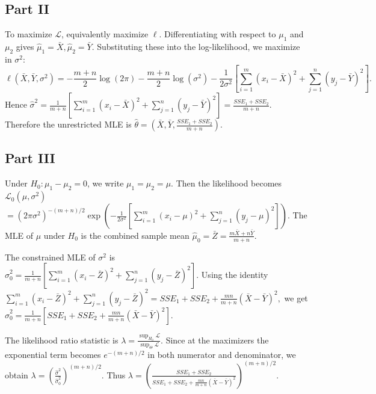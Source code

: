 \documentclass[letterpaper]{article}
\begin{document}
		\clearpage
		
		\subsection{Part II}
		
		To maximize $\mathcal L$, equivalently maximize $\ell$. Differentiating with respect to $\mu_1$ and $\mu_2$ gives
		$
		\hat\mu_1=\bar X,  \hat\mu_2=\bar Y.
		$ Substituting these into the log-likelihood, we maximize in $\sigma^2$:
		$$
		\ell(\bar X,\bar Y,\sigma^2)
		=
		-\frac{m+n}{2}\log(2\pi)
		-\frac{m+n}{2}\log(\sigma^2)
		-\frac{1}{2\sigma^2}
		\left[
		\sum_{i=1}^m (x_i-\bar X)^2+\sum_{j=1}^n (y_j-\bar Y)^2
		\right].
		$$
		Hence
		$
		\hat\sigma^2
		=
		\frac{1}{m+n}
		\left[
		\sum_{i=1}^m (x_i-\bar X)^2+\sum_{j=1}^n (y_j-\bar Y)^2
		\right]
		=
		\frac{SSE_1+SSE_2}{m+n}.
		$ Therefore the unrestricted MLE is
		$
		\hat\theta=
		\left(
		\bar X,\bar Y,\frac{SSE_1+SSE_2}{m+n}
		\right).
		$
		
		\clearpage
		
		\subsection{Part III}
		
		Under $H_0:\mu_1-\mu_2=0$, we write $\mu_1=\mu_2=\mu$. Then the likelihood becomes $
		\mathcal L_0(\mu,\sigma^2)$\\
		$
		=
		(2\pi\sigma^2)^{-(m+n)/2}
		\exp\!\left(
		-\frac{1}{2\sigma^2}
		\left[
		\sum_{i=1}^m (x_i-\mu)^2+\sum_{j=1}^n (y_j-\mu)^2
		\right]
		\right).
		$ The MLE of $\mu$ under $H_0$ is the combined sample mean
		$
		\hat\mu_0=\bar Z=\frac{m\bar X+n\bar Y}{m+n}.
		$
		
		The constrained MLE of $\sigma^2$ is
		$
		\hat\sigma_0^2
		=
		\frac{1}{m+n}
		\left[
		\sum_{i=1}^m (x_i-\bar Z)^2+\sum_{j=1}^n (y_j-\bar Z)^2
		\right].
		$ Using the identity
		$
		\sum_{i=1}^m (x_i-\bar Z)^2+\sum_{j=1}^n (y_j-\bar Z)^2$$
		=
		SSE_1+SSE_2+\frac{mn}{m+n}(\bar X-\bar Y)^2,
		$
		we get
		$
		\hat\sigma_0^2
		=
		\frac{1}{m+n}
		\left[
		SSE_1+SSE_2+\frac{mn}{m+n}(\bar X-\bar Y)^2
		\right].
		$
		
		The likelihood ratio statistic is
		$
		\lambda
		=
		\frac{\sup_{H_0}\mathcal L}{\sup_{\Theta}\mathcal L}.
		$
		Since at the maximizers the exponential term becomes $e^{-(m+n)/2}$ in both numerator and denominator, we obtain
		$
		\lambda
		=
		\left(\frac{\hat\sigma^2}{\hat\sigma_0^2}\right)^{(m+n)/2}.
		$
		Thus
		$
		\lambda
		=
		\left(
		\frac{SSE_1+SSE_2}
		{SSE_1+SSE_2+\frac{mn}{m+n}(\bar X-\bar Y)^2}
		\right)^{(m+n)/2}.
		$
		
\end{document}
